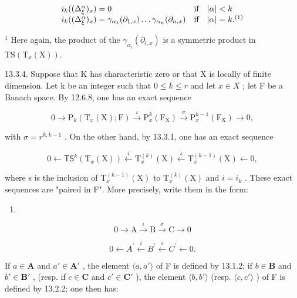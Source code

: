 \[
\begin{array}{l l} i _ {k} ((\Delta_ {\xi} ^ {\alpha}) _ {x}) = 0 & \text {if} \quad | \alpha | <   k \\ i _ {k} ((\Delta_ {\xi} ^ {\alpha}) _ {x}) = \gamma_ {\alpha_ {1}} (\partial_ {1, x}) \dots \gamma_ {\alpha_ {n}} (\partial_ {n, x}) & \text {if} \quad | \alpha | = k. ^ {(1)} \end{array}
\]

\(^{1}\) Here again, the product of the \(\gamma_{\alpha_{i}}(\partial_{i,x})\) is a symmetric product in \(\mathrm{TS}(\mathrm{T}_{x}(\mathrm{X}))\).

13.3.4. Suppose that K has characteristic zero or that X is locally of finite dimension. Let k be an integer such that \(0 \leqslant k \leqslant r\) and let \(x \in X\) ; let F be a Banach space. By 12.6.8, one has an exact sequence

\[
0 \rightarrow \mathrm{P} _ {k} (\mathrm{T} _ {x} (\mathrm{X}); \mathrm{F}) \stackrel {{\iota}} {{\rightarrow}} \mathrm{P} _ {x} ^ {k} (\mathrm{F} _ {\mathrm{X}}) \stackrel {{\sigma}} {{\rightarrow}} \mathrm{P} _ {x} ^ {k - 1} (\mathrm{F} _ {\mathrm{X}}) \rightarrow 0,\tag{i}
\]

with \(\sigma = r^{k, k-1}\) . On the other hand, by 13.3.1, one has an exact sequence

\[
0 \leftarrow \mathsf {T S} ^ {k} (\mathrm{T} _ {x} (\mathrm{X})) \stackrel {{i}} {{\leftarrow}} \mathrm{T} _ {x} ^ {(k)} (\mathrm{X}) \stackrel {{s}} {{\leftarrow}} \mathrm{T} _ {x} ^ {(k - 1)} (\mathrm{X}) \leftarrow 0,\tag{ii}
\]

where s is the inclusion of \(\mathrm{T}_{x}^{(k-1)}(\mathrm{X})\) to \(\mathrm{T}_{x}^{(k)}(\mathrm{X})\) and \(i=i_{k}\) . These exact sequences are "paired in F". More precisely, write them in the form:

\begin{enumerate}
\def\labelenumi{(\roman{enumi})}
\tightlist
\item
\end{enumerate}

\[
0 \rightarrow \mathrm{A} \xrightarrow {\iota} \mathrm{B} \xrightarrow {\sigma} \mathrm{C} \rightarrow 0\tag{ii}
\]

\[
0 \leftarrow A ^ {\prime} \stackrel {i} {\leftarrow} B ^ {\prime} \stackrel {s} {\leftarrow} C ^ {\prime} \leftarrow 0.
\]

If \(a \in \mathbf{A}\) and \(a' \in \mathbf{A}'\) , the element \(\langle a, a' \rangle\) of F is defined by 13.1.2; if \(b \in \mathbf{B}\) and \(b' \in \mathbf{B}'\) , (resp. if \(c \in \mathbf{C}\) and \(c' \in \mathbf{C}'\) ), the element \(\langle b, b' \rangle\) (resp. \(\langle c, c' \rangle\) ) of F is defined by 13.2.2; one then has:


